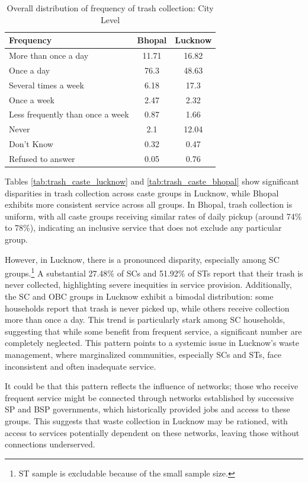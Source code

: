\begin{table}[ht]
\centering
\caption{Overall distribution of frequency of trash collection: City Level}
\label{tab:trash_collection}
\begin{tabular}{|l|c|c|}
\hline
\textbf{Frequency} & \textbf{Bhopal} & \textbf{Lucknow} \\
\hline
More than once a day & 11.71 & 16.82 \\
\hline
Once a day & 76.3 & 48.63 \\
\hline
Several times a week & 6.18 & 17.3 \\
\hline
Once a week & 2.47 & 2.32 \\
\hline
Less frequently than once a week & 0.87 & 1.66 \\
\hline
Never & 2.1 & 12.04 \\
\hline
Don't Know & 0.32 & 0.47 \\
\hline
Refused to answer & 0.05 & 0.76 \\
\hline
\end{tabular}
\end{table}

Tables \ref{tab:trash_caste_lucknow} and \ref{tab:trash_caste_bhopal} show significant disparities in trash collection across caste groups in Lucknow, while Bhopal exhibits more consistent service across all groups. In Bhopal, trash collection is uniform, with all caste groups receiving similar rates of daily pickup (around 74\% to 78\%), indicating an inclusive service that does not exclude any particular group.

However, in Lucknow, there is a pronounced disparity, especially among SC groups.\footnote{ST sample is excludable because of the small sample size.} A substantial 27.48\% of SCs and 51.92\% of STs report that their trash is never collected, highlighting severe inequities in service provision. Additionally, the SC and OBC groups in Lucknow exhibit a bimodal distribution: some households report that trash is never picked up, while others receive collection more than once a day. This trend is particularly stark among SC households, suggesting that while some benefit from frequent service, a significant number are completely neglected. This pattern points to a systemic issue in Lucknow's waste management, where marginalized communities, especially SCs and STs, face inconsistent and often inadequate service.

It could be that this pattern reflects the influence of networks; those who receive frequent service might be connected through networks established by successive SP and BSP governments, which historically provided jobs and access to these groups. This suggests that waste collection in Lucknow may be rationed, with access to services potentially dependent on these networks, leaving those without connections underserved.

